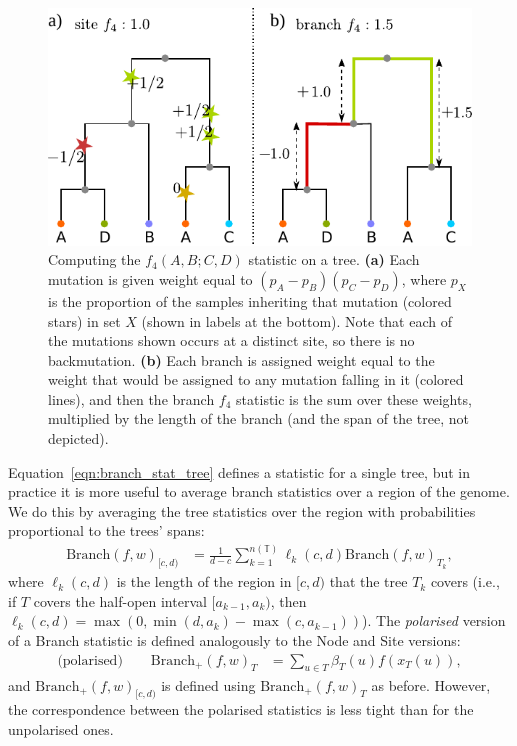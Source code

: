 \documentclass{article}
\newcommand{\branch}{\mbox{Branch}} %
\newcommand{\branchp}{\mbox{Branch}_+} %
\newcommand{\treeseq}{\mathbb{T}} %
\newcommand{\iw}{w} %
\newcommand{\nw}{x} %
\begin{document}
\begin{figure}
    \centering
    \includegraphics{figures/branch_site_diagram}
    \caption{
    Computing the $f_4(A,B;C,D)$ statistic on a tree.
    \textbf{(a)} Each mutation is given weight equal to $(p_A - p_B)(p_C - p_D)$,
    where $p_X$ is the proportion of the samples inheriting that mutation (colored stars) in set $X$
    (shown in labels at the bottom).
    Note that each of the mutations shown occurs at a distinct site, so there is no backmutation.
    \textbf{(b)} Each branch is assigned weight equal to the weight that would be assigned
    to any mutation falling in it (colored lines), and then the branch $f_4$ statistic
    is the sum over these weights, multiplied by the length of the branch
    (and the span of the tree, not depicted).
        \label{fig:branch_site_diagram}
    }
\end{figure}

Equation~\eqref{eqn:branch_stat_tree} defines a statistic for a single tree,
but in practice it is more useful to average branch statistics
over a region of the genome. We do this by averaging the tree statistics over the region
with probabilities proportional to the trees' spans:
\begin{align}
    \branch(f, \iw)_{[c,d)}
    &=
    \frac{1}{d-c} \sum_{k=1}^{n(\treeseq)} \ell_k(c,d) \branch(f, \iw)_{T_k} ,
\end{align}
where $\ell_k(c,d)$ is the length of the region in $[c,d)$ that the tree $T_k$ covers
(i.e., if $T$ covers the half-open interval $[a_{k-1},a_k)$,
then $\ell_k(c,d) = \max(0, \min(d,a_k) - \max(c,a_{k-1}))$).
The \emph{polarised} version of a Branch statistic
is defined analogously to the Node and Site versions:
\begin{align} \label{eqn:branch_polarised}
    \text{(polarised)} \qquad
    \branchp(f, \iw)_T
    &=
    \sum_{u \in T} \beta_T(u) f(\nw_{T}(u)) ,
\end{align}
and $\branchp(f, \iw)_{[c,d)}$ is defined using $\branchp(f, \iw)_T$ as before.
However, the correspondence between the polarised statistics is less tight
than for the unpolarised ones.
\end{document}

